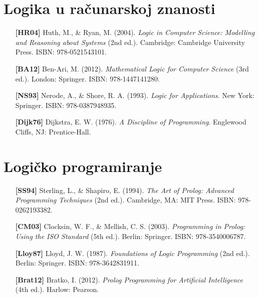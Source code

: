 \section{Logika u računarskoj znanosti}

\begin{itemize}[leftmargin=2cm, labelsep=0.5cm, itemsep=0.3cm]

\item[\textbf{[HR04]}] Huth, M., \& Ryan, M. (2004). \textit{Logic in Computer Science: Modelling and Reasoning about Systems} (2nd ed.). Cambridge: Cambridge University Press. ISBN: 978-0521543101.

\item[\textbf{[BA12]}] Ben-Ari, M. (2012). \textit{Mathematical Logic for Computer Science} (3rd ed.). London: Springer. ISBN: 978-1447141280.

\item[\textbf{[NS93]}] Nerode, A., \& Shore, R. A. (1993). \textit{Logic for Applications}. New York: Springer. ISBN: 978-0387948935.

\item[\textbf{[Dijk76]}] Dijkstra, E. W. (1976). \textit{A Discipline of Programming}. Englewood Cliffs, NJ: Prentice-Hall.

\end{itemize}

\section{Logičko programiranje}

\begin{itemize}[leftmargin=2cm, labelsep=0.5cm, itemsep=0.3cm]

\item[\textbf{[SS94]}] Sterling, L., \& Shapiro, E. (1994). \textit{The Art of Prolog: Advanced Programming Techniques} (2nd ed.). Cambridge, MA: MIT Press. ISBN: 978-0262193382.

\item[\textbf{[CM03]}] Clocksin, W. F., \& Mellish, C. S. (2003). \textit{Programming in Prolog: Using the ISO Standard} (5th ed.). Berlin: Springer. ISBN: 978-3540006787.

\item[\textbf{[Lloy87]}] Lloyd, J. W. (1987). \textit{Foundations of Logic Programming} (2nd ed.). Berlin: Springer. ISBN: 978-3642831911.

\item[\textbf{[Brat12]}] Bratko, I. (2012). \textit{Prolog Programming for Artificial Intelligence} (4th ed.). Harlow: Pearson.

\end{itemize}

